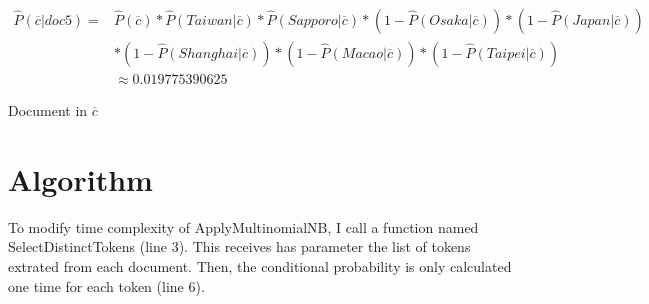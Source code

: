 \documentclass{article}
\begin{document}
\begin{equation}
    \begin{aligned}
\hat{P}(\overline{c}|doc5) = {} & \hat{P}(\overline{c}) * \hat{P}(Taiwan|\overline{c}) *  \hat{P}(Sapporo|\overline{c}) * (1 - \hat{P}(Osaka|\overline{c}) ) * (1-\hat{P}(Japan|\overline{c}) ) \\
& * (1 - \hat{P}(Shanghai|\overline{c}) ) * (1-\hat{P}(Macao|\overline{c}) ) * (1 - \hat{P}(Taipei|\overline{c}) ) \\ 
& \approx 0.019775390625
 \end{aligned}
\end{equation}

Document in $\overline{c}$

\section{Algorithm}

To modify time complexity of ApplyMultinomialNB, I call a function named SelectDistinctTokens (line 3). This receives has parameter the list of tokens extrated from each document. Then, the conditional probability is only calculated one time for each token (line 6). 

\makeatletter
    \def\BState{\State\hskip-\ALG@thistlm}
    \makeatother

\end{document}
